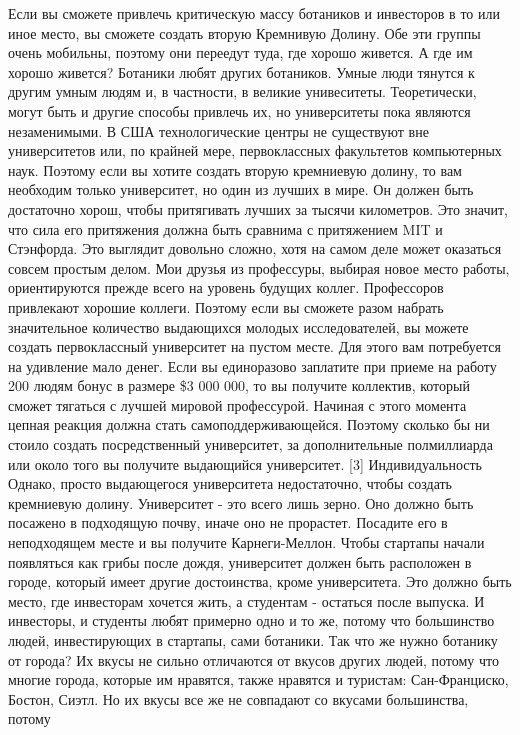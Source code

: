 \documentclass[ebook,12pt,oneside,openany]{memoir}
\begin{document}
Если вы сможете привлечь критическую массу ботаников и инвесторов в то
или иное место, вы сможете создать вторую Кремнивую Долину. Обе эти
группы очень мобильны, поэтому они переедут туда, где хорошо живется.
А где им хорошо живется? Ботаники любят других ботаников. Умные люди
тянутся к другим умным людям и, в частности, в великие унивеситеты.
Теоретически, могут быть и другие способы привлечь их, но университеты
пока являются незаменимыми. В США технологические центры не существуют
вне университетов или, по крайней мере, первоклассных факультетов
компьютерных наук. Поэтому если вы хотите создать вторую кремниевую
долину, то вам необходим только университет, но один из лучших в мире.
Он должен быть достаточно хорош, чтобы притягивать лучших за тысячи
километров. Это значит, что сила его притяжения должна быть сравнима с
притяжением MIT и Стэнфорда. Это выглядит довольно сложно, хотя на
самом деле может оказаться совсем простым делом. Мои друзья из
профессуры, выбирая новое место работы, ориентируются прежде всего на
уровень будущих коллег. Профессоров привлекают хорошие коллеги.
Поэтому если вы сможете разом набрать значительное количество
выдающихся молодых исследователей, вы можете создать первоклассный
университет на пустом месте. Для этого вам потребуется на удивление
мало денег. Если вы единоразово заплатите при приеме на работу 200
людям бонус в размере \$3 000 000, то вы получите коллектив, который
сможет тягаться с лучшей мировой профессурой. Начиная с этого момента
цепная реакция должна стать самоподдерживающейся. Поэтому сколько бы
ни стоило создать посредственный университет, за дополнительные
полмиллиарда или около того вы получите выдающийся университет. [3]
Индивидуальность Однако, просто выдающегося университета недостаточно,
чтобы создать кремниевую долину. Университет - это всего лишь зерно.
Оно должно быть посажено в подходящую почву, иначе оно не прорастет.
Посадите его в неподходящем месте и вы получите Карнеги-Меллон. Чтобы
стартапы начали появляться как грибы после дождя, университет должен
быть расположен в городе, который имеет другие достоинства, кроме
университета. Это должно быть место, где инвесторам хочется жить, а
студентам - остаться после выпуска. И инвесторы, и студенты любят
примерно одно и то же, потому что большинство людей, инвестирующих в
стартапы, сами ботаники. Так что же нужно ботанику от города? Их вкусы
не сильно отличаются от вкусов других людей, потому что многие города,
которые им нравятся, также нравятся и туристам: Сан-Франциско, Бостон,
Сиэтл. Но их вкусы все же не совпадают со вкусами большинства, потому
\end{document}
